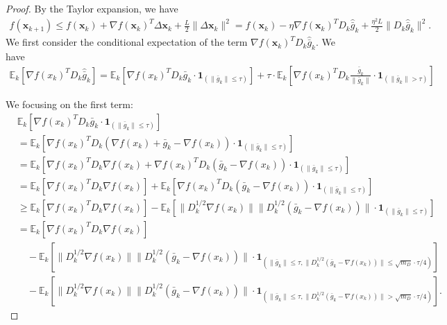 \documentclass{article}
\newcommand{\bx}{\boldsymbol{x}}
\newcommand{\barg}{\bar{g}}
\theoremstyle{plain}
\theoremstyle{definition}
\theoremstyle{remark}
\begin{document}
\begin{proof}

By the Taylor expansion, we have
    \begin{align*}
    f(\bx_{k+1})  \le f(\bx_k) + \nabla f(\bx_k)^T \Delta \bx_k + \frac{L }{2} \|\Delta \bx_k\|^2  = f(\bx_k) - \eta  \nabla f(\bx_k)^T D_k\widehat{\barg}_k + \frac{\eta^2 L }{2} \|D_k\widehat{\barg}_k\|^2.
\end{align*}
We first consider the conditional expectation of the 
term $\nabla f(\bx_k)^T D_k\widehat{\barg}_k$. We have
\begin{align*}
\mathbb{E}_k\left[\nabla f(x_k)^T D_k \widehat{\barg}_k \right] = \mathbb{E}_k\left[\nabla f(x_k)^T D_k \bar{g}_k \cdot \boldsymbol{1}_{(\|\bar{g}_k\| \le \tau)}\right]  + \tau \cdot \mathbb{E}_k\left[\nabla f(x_k)^T D_k \frac{\bar{g}_k}{\|\bar{g}_k\|} \cdot \boldsymbol{1}_{(\|\bar{g}_k\| > \tau)} \right]
\end{align*}

We focusing on the first term:
\begin{align*}
& \mathbb{E}_k\left[\nabla f(x_k)^T D_k \bar{g}_k \cdot \boldsymbol{1}_{(\|\bar{g}_k\| \le \tau)}\right] \\
&= \mathbb{E}_k\left[\nabla f(x_k)^T D_k (\nabla f(x_k) + \bar{g}_k - \nabla f(x_k)) \cdot \boldsymbol{1}_{(\|\bar{g}_k\| \le \tau)} \right] \\
&= \mathbb{E}_k\left[\nabla f(x_k)^T D_k \nabla f(x_k) + \nabla f(x_k)^T D_k (\bar{g}_k - \nabla f(x_k)) \cdot \boldsymbol{1}_{(\|\bar{g}_k\| \le \tau)} \right]\\
& = \mathbb{E}_k\left[\nabla f(x_k)^T D_k \nabla f(x_k)\right] + \mathbb{E}_k\left[\nabla f(x_k)^T D_k (\bar{g}_k - \nabla f(x_k)) \cdot \boldsymbol{1}_{(\|\bar{g}_k\| \le \tau)}\right]\\
& \geq \mathbb{E}_k\left[\nabla f(x_k)^T D_k \nabla f(x_k)\right] - \mathbb{E}_k\left[\|D_k^{1/2}\nabla f(x_k)\| \|D_k^{1/2} (\bar{g}_k - \nabla f(x_k))\| \cdot \boldsymbol{1}_{(\|\bar{g}_k\| \le \tau)} \right]\\
& = \mathbb{E}_k\left[\nabla f(x_k)^T D_k \nabla f(x_k)\right] \\
& \quad - \mathbb{E}_k\left[\|D_k^{1/2}\nabla f(x_k)\| \|D_k^{1/2} (\bar{g}_k - \nabla f(x_k))\| \cdot \boldsymbol{1}_{(\|\bar{g}_k\| \le \tau,\|D_k^{1/2}(\bar{g}_k - \nabla f(x_k))\|\leq \sqrt{m_D}\cdot\tau/4)}\right]\\
& \quad - \mathbb{E}_k\left[\|D_k^{1/2}\nabla f(x_k)\| \|D_k^{1/2} (\bar{g}_k - \nabla f(x_k))\| \cdot \boldsymbol{1}_{(\|\bar{g}_k\| \le \tau,\|D_k^{1/2}(\bar{g}_k - \nabla f(x_k))\|> \sqrt{m_D}\cdot\tau/4)}\right] .
\end{align*}


\end{proof}
\end{document}
